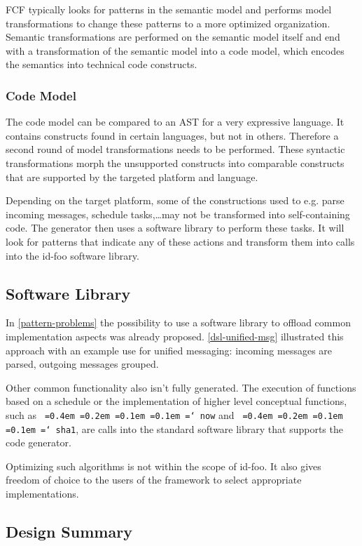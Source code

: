 \documentclass[conference]{IEEEtran}
\newcommand{\NAME}{id-foo\xspace}
\newcommand*\justify{%
  \fontdimen2\font=0.4em%
  \fontdimen3\font=0.2em%
  \fontdimen4\font=0.1em%
  \fontdimen7\font=0.1em%
  \hyphenchar\font=`\-%
}
\newcommand{\ttt}[1]{\texttt{\justify{#1}}}
\begin{document}
FCF typically looks for patterns in the semantic model and performs model
transformations to change these patterns to a more optimized organization.
Semantic transformations are performed on the semantic model itself and end
with a transformation of the semantic model into a code model, which encodes
the semantics into technical code constructs.

\subsubsection*{Code Model}

The code model can be compared to an AST for a very expressive language. It
contains constructs found in certain languages, but not in others. Therefore a
second round of model transformations needs to be performed. These syntactic
transformations morph the unsupported constructs into comparable constructs
that are supported by the targeted platform and language.

Depending on the target platform, some of the constructions used to e.g. parse
incoming messages, schedule tasks,\dots may not be transformed into
self-containing code. The generator then uses a software library to perform
these tasks. It will look for patterns that indicate any of these actions and
transform them into calls into the \NAME software library.

\subsection{Software Library}
\label{software-lib-design}

In \ref{pattern-problems} the possibility to use a software library to offload
common implementation aspects was already proposed. \ref{dsl-unified-msg}
illustrated this approach with an example use for unified messaging: incoming
messages are parsed, outgoing messages grouped.

Other common functionality also isn't fully generated. The execution of
functions based on a schedule or the implementation of higher level conceptual
functions, such as \ttt{now} and \ttt{sha1}, are calls into the standard
software library that supports the code generator.

Optimizing such algorithms is not within the scope of \NAME. It also gives
freedom of choice to the users of the framework to select appropriate
implementations.

\subsection{Design Summary}
\end{document}
